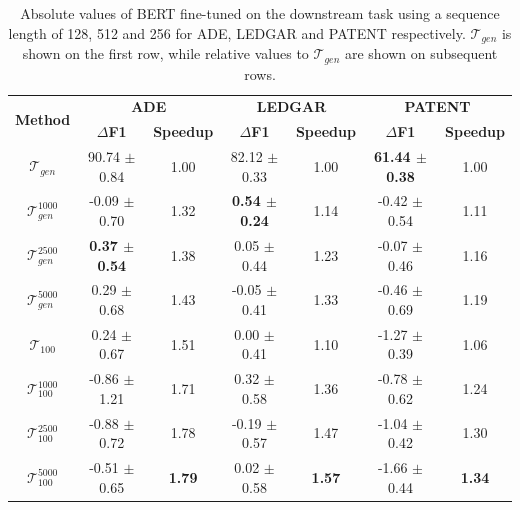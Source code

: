 \documentclass[11pt]{article}
\def\tokgen{\mathcal{T}_{gen}}
\def\tok100{\mathcal{T}_{100}}
\begin{document}
\renewcommand{\arraystretch}{1.3}
\begin{table}[ht]
    \centering
    \begin{tabular}{ccccccc}
        \hline
        \multirow{2}{*}{\textbf{Method}} & 
        \multicolumn{2}{c}{\textbf{ADE}} & \multicolumn{2}{c}{\textbf{LEDGAR}} & \multicolumn{2}{c}{\textbf{PATENT}} \\
        
        &   $\Delta$\textbf{F1} &   \textbf{Speedup}
        &   $\Delta$\textbf{F1} &   \textbf{Speedup} 
        &   $\Delta$\textbf{F1} &   \textbf{Speedup}    \\       
        \hline
        
        $\tokgen$           & 90.74 $\pm$ 0.84          & 1.00          & 82.12 $\pm$ 0.33          & 1.00          & \textbf{61.44 $\pm$ 0.38} & 1.00          \\       
        \hline

        $\tokgen^{1000}$    & -0.09 $\pm$ 0.70          & 1.32          & \textbf{0.54 $\pm$ 0.24}  & 1.14          & -0.42 $\pm$ 0.54          & 1.11          \\
        $\tokgen^{2500}$    & \textbf{0.37 $\pm$ 0.54}  & 1.38          & 0.05 $\pm$ 0.44           & 1.23          & -0.07 $\pm$ 0.46          & 1.16          \\
        $\tokgen^{5000}$    & 0.29 $\pm$ 0.68           & 1.43          & -0.05 $\pm$ 0.41          & 1.33          & -0.46 $\pm$ 0.69          & 1.19          \\    
        \hline

        $\tok100$           & 0.24 $\pm$ 0.67           & 1.51          & 0.00 $\pm$ 0.41           & 1.10          & -1.27 $\pm$ 0.39          & 1.06          \\
        $\tok100^{1000}$    & -0.86 $\pm$ 1.21          & 1.71          & 0.32 $\pm$ 0.58           & 1.36          & -0.78 $\pm$ 0.62          & 1.24          \\
        $\tok100^{2500}$    & -0.88 $\pm$ 0.72          & 1.78          & -0.19 $\pm$ 0.57          & 1.47          & -1.04 $\pm$ 0.42          & 1.30          \\
        $\tok100^{5000}$    & -0.51 $\pm$ 0.65          & \textbf{1.79} & 0.02 $\pm$ 0.58           & \textbf{1.57} & -1.66 $\pm$ 0.44          & \textbf{1.34} \\      
        \hline
    \end{tabular}
\caption{Absolute values of BERT fine-tuned on the downstream task using a sequence length of 128, 512 and 256 for ADE, LEDGAR and PATENT respectively. $\tokgen$ is shown on the first row, while relative values to $\tokgen$ are shown on subsequent rows.}
\label{table:relative}
\end{table}
\end{document}
